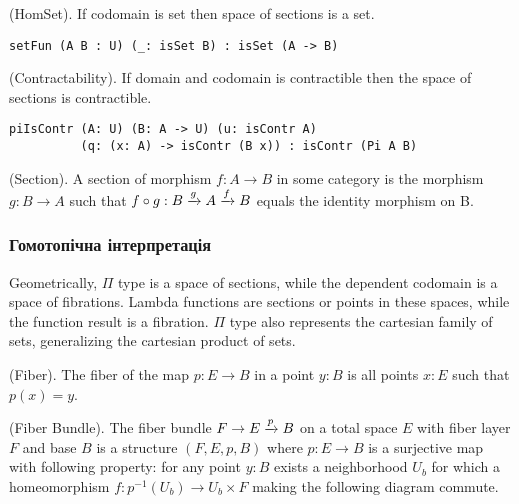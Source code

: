 \begin{theorem} (HomSet).
If codomain is set then space of sections is a set.
\begin{lstlisting}
setFun (A B : U) (_: isSet B) : isSet (A -> B)
\end{lstlisting}
\end{theorem}

\begin{theorem} (Contractability).
If domain and codomain is contractible then the space of sections is contractible.
\begin{lstlisting}
piIsContr (A: U) (B: A -> U) (u: isContr A)
          (q: (x: A) -> isContr (B x)) : isContr (Pi A B)
\end{lstlisting}
\end{theorem}

\begin{definition} (Section).
A section of morphism $f: A \rightarrow B$ in some category is the morphism $g: B \rightarrow A$
such that $f \circ g: B \xrightarrow{{g}} A \xrightarrow{{f}} B$ equals the identity morphism on B.
\end{definition}

\subsubsection*{Гомотопічна інтерпретація}

Geometrically, $\Pi$ type is a space of sections, while the dependent codomain is a space of fibrations.
Lambda functions are sections or points in these spaces, while the function result is a fibration.
$\Pi$ type also represents the cartesian family of sets, generalizing the cartesian product of sets.

\begin{definition} (Fiber).
The fiber of the map $p: E \rightarrow B$ in a point $y: B$ is all points $x: E$ such that $p(x)=y$.
\end{definition}

\begin{definition} (Fiber Bundle).
The fiber bundle $ F \rightarrow E \xrightarrow{{p}} B$ on a total space $E$ with fiber layer $F$ and base $B$ is a
structure $(F,E,p,B)$ where $p: E \rightarrow B$ is a surjective map with following property:
for any point $y: B$ exists a neighborhood $U_b$ for which a homeomorphism $f: p^{-1}(U_b) \rightarrow U_b \times F$
making the following diagram commute.
\begin{center}
\end{center}
\end{definition}

